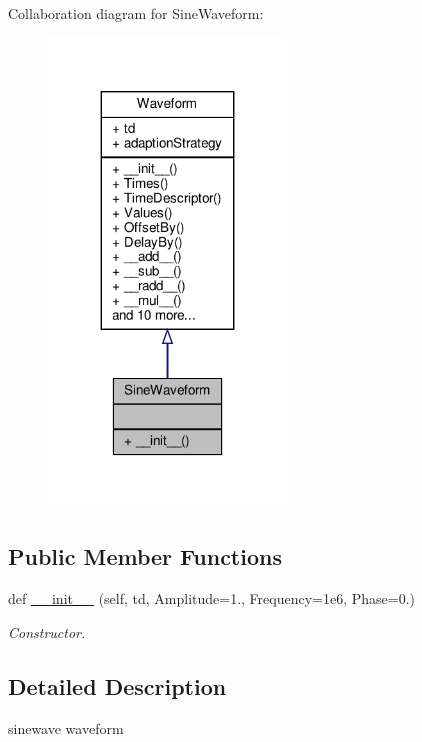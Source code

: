 Collaboration diagram for Sine\+Waveform\+:
\nopagebreak
\begin{figure}[H]
\begin{center}
\leavevmode
\includegraphics[width=179pt]{classSignalIntegrity_1_1TimeDomain_1_1Waveform_1_1SineWaveform_1_1SineWaveform__coll__graph}
\end{center}
\end{figure}
\subsection*{Public Member Functions}
\begin{DoxyCompactItemize}
\item 
def \hyperlink{classSignalIntegrity_1_1TimeDomain_1_1Waveform_1_1SineWaveform_1_1SineWaveform_a4998578e3228973c947cb920d4392c79}{\+\_\+\+\_\+init\+\_\+\+\_\+} (self, td, Amplitude=1., Frequency=1e6, Phase=0.)
\begin{DoxyCompactList}\small\item\em Constructor. \end{DoxyCompactList}\end{DoxyCompactItemize}


\subsection{Detailed Description}
sinewave waveform 

